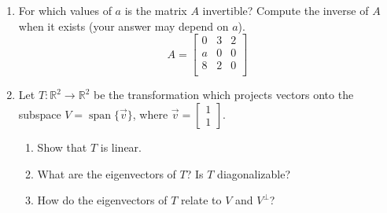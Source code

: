\documentclass[red]{tutorial}
\newcommand{\R}{\mathbb{R}}
\newcommand{\mat}[1]{\begin{bmatrix} #1 %
\end{bmatrix}}
\DeclareMathOperator{\Span} {span}
\theoremstyle{definition}
\theoremstyle{theorem}
\begin{document}
\begin{tutorial}
\begin{enumerate}
    \item
      For which values of $a$ is the matrix $A$ invertible? Compute the inverse
      of $A$ when it exists (your answer may depend on $a$).
      \begin{equation*}
        A = 
        \begin{bmatrix}
          0 & 3 & 2 \\
          a & 0 & 0 \\
          8 & 2 & 0 \\
        \end{bmatrix}
      \end{equation*}
    \item
      Let $T\colon\R^2\to\R^2$ be the transformation which projects vectors
      onto the subspace $V=\Span\{\vec v\}$, where $\vec v = \mat{1\\1}$.
      \begin{enumerate}
        \item 
          Show that $T$ is linear.
        \item
          What are the eigenvectors of $T$? Is $T$ diagonalizable?
        \item
          How do the eigenvectors of $T$ relate to $V$ and $V^\perp$?
      \end{enumerate}
  \end{enumerate}
\end{tutorial}
\end{document}
